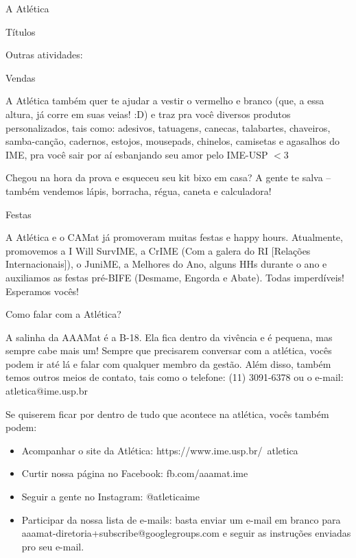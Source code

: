 \begin{secao}{A Atlética}
\begin{subsecao}{Títulos}
\end{subsecao}
Outras atividades:

\begin{subsecao}{Vendas}

A Atlética também quer te ajudar a vestir o vermelho e branco (que, a essa
altura, já corre em suas veias! :D) e traz pra você diversos produtos
personalizados, tais como: adesivos, tatuagens, canecas, talabartes, chaveiros,
samba-canção, cadernos, estojos, mousepads, chinelos, camisetas e agasalhos do
IME, pra você sair por aí esbanjando seu amor pelo IME-USP $<$3

Chegou na hora da prova e esqueceu seu kit bixo em casa? A gente te salva --
também vendemos lápis, borracha, régua, caneta e calculadora!

\end{subsecao}
\begin{subsecao}{Festas}

A Atlética e o CAMat já promoveram muitas festas e happy hours. Atualmente,
promovemos a I Will SurvIME, a CrIME (Com a galera do RI [Relações
Internacionais]), o JuniME, a Melhores do Ano, alguns HHs durante o ano e
auxiliamos as festas pré-BIFE (Desmame, Engorda e Abate). Todas imperdíveis!
Esperamos vocês!

\end{subsecao}
\begin{subsecao}{Como falar com a Atlética?}

A salinha da AAAMat é a B-18. Ela fica dentro da vivência e é pequena, mas
sempre cabe mais um! Sempre que precisarem conversar com a atlética, vocês
podem ir até lá e falar com qualquer membro da gestão. Além disso, também temos
outros meios de contato, tais como o telefone: (11) 3091-6378 ou o e-mail:
atletica@ime.usp.br

Se quiserem ficar por dentro de tudo que acontece na atlética, vocês também
podem:

\begin{itemize}
  \item Acompanhar o site da Atlética: https://www.ime.usp.br/~atletica
  \item Curtir nossa página no Facebook: fb.com/aaamat.ime
  \item Seguir a  gente no Instagram: @atleticaime
  \item Participar da nossa lista de e-mails: basta enviar um e-mail em branco
        para aaamat-diretoria+subscribe@googlegroups.com e seguir as instruções
        enviadas pro seu e-mail.
\end{itemize}


\end{subsecao}
\end{secao}
